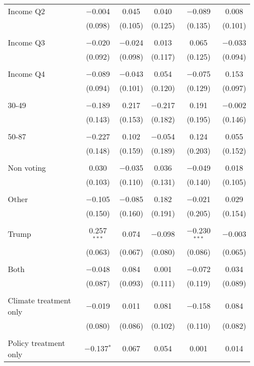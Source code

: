 \begin{tabular}{@{\extracolsep{5pt}}lccccc}
 Income Q2 & $-$0.004 & 0.045 & 0.040 & $-$0.089 & 0.008 \\ 
  & (0.098) & (0.105) & (0.125) & (0.135) & (0.101) \\ 
  & & & & & \\ 
 Income Q3 & $-$0.020 & $-$0.024 & 0.013 & 0.065 & $-$0.033 \\ 
  & (0.092) & (0.098) & (0.117) & (0.125) & (0.094) \\ 
  & & & & & \\ 
 Income Q4 & $-$0.089 & $-$0.043 & 0.054 & $-$0.075 & 0.153 \\ 
  & (0.094) & (0.101) & (0.120) & (0.129) & (0.097) \\ 
  & & & & & \\ 
 30-49 & $-$0.189 & 0.217 & $-$0.217 & 0.191 & $-$0.002 \\ 
  & (0.143) & (0.153) & (0.182) & (0.195) & (0.146) \\ 
  & & & & & \\ 
 50-87 & $-$0.227 & 0.102 & $-$0.054 & 0.124 & 0.055 \\ 
  & (0.148) & (0.159) & (0.189) & (0.203) & (0.152) \\ 
  & & & & & \\ 
 Non voting & 0.030 & $-$0.035 & 0.036 & $-$0.049 & 0.018 \\ 
  & (0.103) & (0.110) & (0.131) & (0.140) & (0.105) \\ 
  & & & & & \\ 
 Other & $-$0.105 & $-$0.085 & 0.182 & $-$0.021 & 0.029 \\ 
  & (0.150) & (0.160) & (0.191) & (0.205) & (0.154) \\ 
  & & & & & \\ 
 Trump & 0.257$^{***}$ & 0.074 & $-$0.098 & $-$0.230$^{***}$ & $-$0.003 \\ 
  & (0.063) & (0.067) & (0.080) & (0.086) & (0.065) \\ 
  & & & & & \\ 
 Both & $-$0.048 & 0.084 & 0.001 & $-$0.072 & 0.034 \\ 
  & (0.087) & (0.093) & (0.111) & (0.119) & (0.089) \\ 
  & & & & & \\ 
 Climate treatment only & $-$0.019 & 0.011 & 0.081 & $-$0.158 & 0.084 \\ 
  & (0.080) & (0.086) & (0.102) & (0.110) & (0.082) \\ 
  & & & & & \\ 
 Policy treatment only & $-$0.137$^{*}$ & 0.067 & 0.054 & 0.001 & 0.014 \\ 

\end{tabular}
